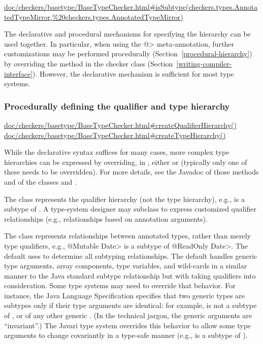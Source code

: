 \urldef{\isSubtypeURL}\url{doc/checkers/basetype/BaseTypeChecker.html#isSubtype(checkers.types.AnnotatedTypeMirror,%20checkers.types.AnnotatedTypeMirror)}

The declarative and procedural mechanisms for specifying the hierarchy can
be used together.  In particular, when using the \<@>
meta-annotation, further customizations may be
performed procedurally (Section~\ref{procedural-hierarchy})
by overriding the  method in the checker class
(Section~\ref{writing-compiler-interface}).
However, the declarative mechanism is sufficient for most type systems.


\subsubsection{Procedurally defining the qualifier and type hierarchy\label{procedural-hierarchy}}

\urldef{\createQualifierHierarchyURL}\url{doc/checkers/basetype/BaseTypeChecker.html#createQualifierHierarchy()}
\urldef{\createTypeHierarchyURL}\url{doc/checkers/basetype/BaseTypeChecker.html#createTypeHierarchy()}

While the declarative syntax suffices for many cases, more complex
type hierarchies can be expressed by overriding, in ,
either  or  (typically
only one of these needs to be overridden).
For more details, see the Javadoc of those methods and of the classes
 and .

The  class represents the qualifier hierarchy (not the
type hierarchy), e.g., 
is a subtype of .  A type-system designer may subclass
 to express customized qualifier
relationships (e.g., relationships based on annotation
arguments).

The  class represents relationships between
annotated types, rather than merely type qualifiers, e.g., \<@Mutable
Date> is a subtype of \<@ReadOnly Date>.  The default  uses
 to determine all subtyping relationships.
The default  handles
generic type arguments, array components, type variables, and
wild-cards in a similar manner to the Java standard subtype
relationship but with taking qualifiers into consideration.  Some type
systems may need to override that behavior.  For instance, the Java
Language Specification specifies that two generic types are subtypes only
if their type arguments are identical:  for example,
 is not a subtype of , or of any other
generic .
(In the technical jargon, the generic arguments are ``invariant''.)
The Javari type system overrides this
behavior to allow some type arguments to change covariantly in a type-safe
manner (e.g.,
 is a subtype of ).


